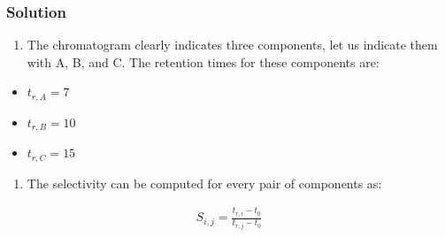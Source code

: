 \documentclass[letterpaper,10pt,english]{jupyterBook}
\begin{document}
\subsubsection{Solution}
\label{\detokenize{Exercise_W5_2021:solution}}\begin{enumerate}
%
\item {} 
\sphinxAtStartPar
The chromatogram clearly indicates three components, let us indicate them with A, B, and C.
The retention times for these components are:

\end{enumerate}
\begin{itemize}
\item {} 
\sphinxAtStartPar
\(t_{r,A}=7\)

\item {} 
\sphinxAtStartPar
\(t_{r,B}=10\)

\item {} 
\sphinxAtStartPar
\(t_{r,C}=15\)

\end{itemize}
\begin{enumerate}
%
\setcounter{enumi}{1}
\item {} 
\sphinxAtStartPar
The selectivity can be computed for every pair of components as:

\end{enumerate}
\begin{equation*}
\begin{split}
S_{i,j}=\frac{t_{r,i}-t_0}{t_{r,j}-t_0}
\end{split}
\end{equation*}
\end{document}

